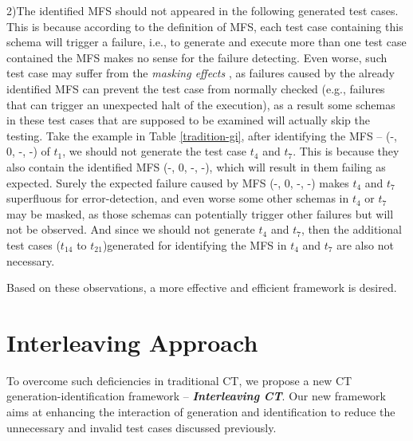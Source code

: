 \documentclass{sig-alternate}
\begin{document}
2)The identified MFS should not appeared in the following generated test cases.  This is because according to the definition of MFS, each test case containing this schema will trigger a failure, i.e., to generate and execute more than one test case contained the MFS makes no sense for the failure detecting. Even worse, such test case may suffer from the \emph{masking effects} \cite{yilmaz2013reducing}, as failures caused by the already identified MFS can prevent the test case from normally checked (e.g., failures that can trigger an unexpected halt of the execution), as a result some schemas in these test cases that are supposed to be examined will actually skip the testing. Take the example in Table \ref{tradition-gi}, after identifying the MFS -- (-, 0, -, -) of $t_{1}$, we should not generate the test case $t_{4}$ and $t_{7}$. This is because they also contain the identified MFS (-, 0, -, -), which will result in them failing as expected. Surely the expected failure caused by MFS (-, 0, -, -) makes $t_{4}$ and $t_{7}$ superfluous for error-detection, and even worse some other schemas in $t_{4}$ or $t_{7}$  may be masked, as those schemas can potentially trigger other failures but will not be observed. And since we should not generate $t_{4}$ and $t_{7}$, then the additional test cases ($t_{14}$ to $t_{21}$)generated for identifying the MFS in $t_{4}$ and $t_{7}$ are also not necessary.

Based on these observations, a more effective and efficient framework is desired.
\section{Interleaving Approach}

To overcome such deficiencies in traditional CT, we propose a new CT generation-identification framework -- \emph{\textbf{Interleaving CT}}. Our new framework aims at enhancing the interaction of generation and identification to reduce the unnecessary and invalid test cases discussed previously.
\end{document}
